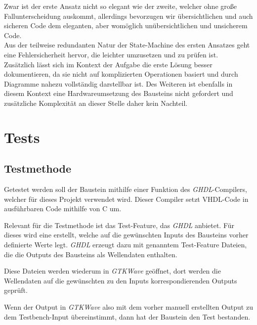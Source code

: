 \documentclass{article}
\begin{document}
  Zwar ist der erste Ansatz nicht so elegant wie der zweite, welcher ohne große Fallunterscheidung auskommt, allerdings bevorzugen wir übersichtlichen und auch sicheren Code dem eleganten, aber womöglich unübersichtlichen und unsicherem Code.\\
  Aus der teilweise redundanten Natur der State-Machine des ersten Ansatzes geht eine Fehlersicherheit hervor, die leichter umzusetzen und zu prüfen ist.\\
  Zusätzlich lässt sich im Kontext der Aufgabe die erste Lösung besser dokumentieren, da sie nicht auf komplizierten Operationen basiert und durch Diagramme nahezu vollständig darstellbar ist. Des Weiteren ist ebenfalls in diesem Kontext eine Hardwareumsetzung des Bausteins nicht gefordert und zusätzliche Komplexität an dieser Stelle daher kein Nachteil.


\section{Tests}
\label{sec:Tests}
  \subsection{Testmethode}
    Getestet werden soll der Baustein mithilfe einer Funktion des \emph{GHDL}-Compilers, welcher für dieses Projekt verwendet wird.
    Dieser Compiler setzt VHDL-Code in ausführbaren Code mithilfe von C um.

    Relevant für die Testmethode ist das Test-Feature, das \emph{GHDL} anbietet. Für dieses wird eine  erstellt,
    welche auf die gewünschten Inputs des Bausteins vorher definierte Werte legt. \emph{GHDL} erzeugt dazu mit genanntem Test-Feature Dateien, die die Outputs des Bausteins als Wellendaten enthalten.

    Diese Dateien werden wiederum in \emph{GTKWave} geöffnet, dort werden die Wellendaten auf die gewünschten zu den Inputs korrespondierenden Outputs geprüft.

    Wenn der Output in \emph{GTKWave} also mit dem vorher manuell erstellten Output zu dem Testbench-Input übereinstimmt, dann hat der Baustein den Test bestanden.
\end{document}
